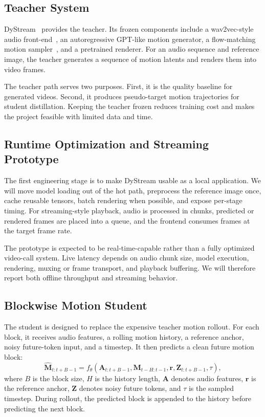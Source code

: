\documentclass{article}
\begin{document}
\subsection{Teacher System}

DyStream~\cite{dystream} provides the teacher. Its frozen components include a wav2vec-style audio front-end~\cite{wav2vec2}, an autoregressive GPT-like motion generator, a flow-matching motion sampler~\cite{flowmatching}, and a pretrained renderer. For an audio sequence and reference image, the teacher generates a sequence of motion latents and renders them into video frames.

The teacher path serves two purposes. First, it is the quality baseline for generated videos. Second, it produces pseudo-target motion trajectories for student distillation. Keeping the teacher frozen reduces training cost and makes the project feasible with limited data and time.

\subsection{Runtime Optimization and Streaming Prototype}

The first engineering stage is to make DyStream usable as a local application. We will move model loading out of the hot path, preprocess the reference image once, cache reusable tensors, batch rendering when possible, and expose per-stage timing. For streaming-style playback, audio is processed in chunks, predicted or rendered frames are placed into a queue, and the frontend consumes frames at the target frame rate.

The prototype is expected to be real-time-capable rather than a fully optimized video-call system. Live latency depends on audio chunk size, model execution, rendering, muxing or frame transport, and playback buffering. We will therefore report both offline throughput and streaming behavior.

\subsection{Blockwise Motion Student}

The student is designed to replace the expensive teacher motion rollout. For each block, it receives audio features, a rolling motion history, a reference anchor, noisy future-token input, and a timestep. It then predicts a clean future motion block:
\begin{equation}
    \hat{\mathbf{M}}_{t:t+B-1}
    =
    f_\theta(
      \mathbf{A}_{t:t+B-1},
      \mathbf{M}_{t-H:t-1},
      \mathbf{r},
      \mathbf{Z}_{t:t+B-1},
      \tau
    ),
\end{equation}
where $B$ is the block size, $H$ is the history length, $\mathbf{A}$ denotes audio features, $\mathbf{r}$ is the reference anchor, $\mathbf{Z}$ denotes noisy future tokens, and $\tau$ is the sampled timestep. During rollout, the predicted block is appended to the history before predicting the next block.
\end{document}
